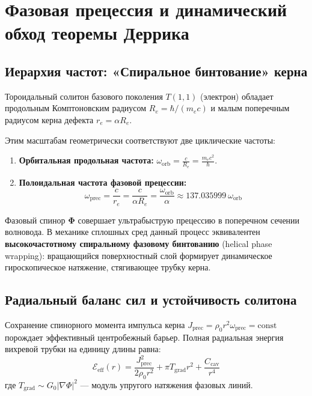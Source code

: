 \documentclass[12pt,a4paper]{article}
\begin{document}
	\section{Фазовая прецессия и динамический обход теоремы Деррика}
	
	\subsection{Иерархия частот: «Спиральное бинтование» керна}
	Тороидальный солитон базового поколения $T(1,1)$ (электрон) обладает продольным Комптоновским радиусом $R_e = \hbar / (m_e c)$ и малым поперечным радиусом керна дефекта $r_e = \alpha R_e$.
	
	Этим масштабам геометрически соответствуют две циклические частоты:
	\begin{enumerate}
		\item \textbf{Орбитальная продольная частота:} $\omega_{\text{orb}} = \frac{c}{R_e} = \frac{m_e c^2}{\hbar}$.
		\item \textbf{Полоидальная частота фазовой прецессии:}
		\begin{equation}
			\omega_{\text{prec}} = \frac{c}{r_e} = \frac{c}{\alpha R_e} = \frac{\omega_{\text{orb}}}{\alpha} \approx 137.035999 \ \omega_{\text{orb}}
		\end{equation}
	\end{enumerate}
	Фазовый спинор $\boldsymbol{\Phi}$ совершает ультрабыструю прецессию в поперечном сечении волновода. В механике сплошных сред данный процесс эквивалентен \textbf{высокочастотному спиральному фазовому бинтованию} (helical phase wrapping): вращающийся поверхностный слой формирует динамическое гироскопическое натяжение, стягивающее трубку керна.
	
	\subsection{Радиальный баланс сил и устойчивость солитона}
	Сохранение спинорного момента импульса керна $J_{\text{prec}} = \rho_0 r^2 \omega_{\text{prec}} = \text{const}$ порождает эффективный центробежный барьер. Полная радиальная энергия вихревой трубки на единицу длины равна:
	\begin{equation}
		\mathcal{E}_{\text{eff}}(r) = \frac{J_{\text{prec}}^2}{2 \rho_0 r^2} + \pi T_{\text{grad}} r^2 + \frac{C_{\text{cav}}}{r^4}
	\end{equation}
	где $T_{\text{grad}} \sim G_0 |\nabla \Phi|^2$ — модуль упругого натяжения фазовых линий.
	
\end{document}

